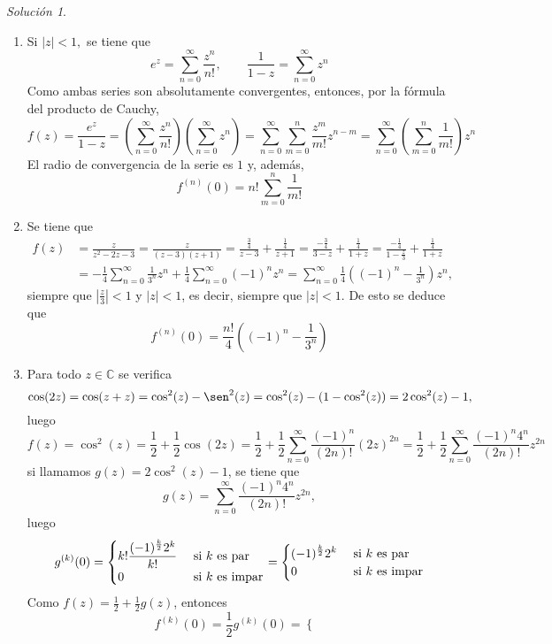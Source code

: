 \documentclass[11pt]{report}
\newcommand{\C}{\mathbb C}
\newcommand{\serie}[2][0]{\sum_{n=#1}^\infty #2}
\theoremstyle{remark}
\newtheorem*{resolution}{Solución}
\begin{document}
\begin{resolution}
\hfill
\begin{enumerate}
    \item Si $|z|<1,$ se tiene que
    \[e^z = \serie{\frac{z^n}{n!}}, \qquad \frac{1}{1-z} = \serie{z^n}\]
    Como ambas series son absolutamente convergentes, entonces, por la fórmula del producto de Cauchy,
    \[f(z)=\frac{e^z}{1-z} = \left(\serie{\frac{z^n}{n!}}\right)\left(\serie{z^n}\right) = \sum_{n=0}^\infty\sum_{m=0}^n\frac{z^m}{m!}z^{n-m} = \sum_{n=0}^\infty \left(\sum_{m=0}^n\frac{1}
    {m!}\right)z^n\]
    El radio de convergencia de la serie es $1$ y, además,
    \[f^{(n)}(0) = n!\sum_{m=0}^n \frac{1}{m!}\]
    \item Se tiene que
    \[
    \begin{aligned}
    f(z)&=\frac{z}{z^2-2z-3} = \frac{z}{(z-3)(z+1)} = \frac{\frac{3}{4}}{z-3}+\frac{\frac{1}{4}}{z+1} =  \frac{-\frac{3}{4}}{3-z}+\frac{\frac{1}{4}}{1+z} = \frac{-\frac{1}{4}}{1-\frac{z}{3}}+\frac{\frac{1}{4}}{1+z} \\
    &= -\frac{1}{4}\serie{\frac{1}{3^n}z^n}+\frac{1}{4}\serie{(-1)^nz^n} = \serie{\frac{1}{4}\left((-1)^n-\frac{1}{3^n}\right)z^n},
    \end{aligned}
    \]
    siempre que $|\frac{z}{3}|<1$ y $|z|<1$, es decir, siempre que $|z|<1$. De esto se deduce que
    \[f^{(n)}(0)=\frac{n!}{4}\left((-1)^n-\frac{1}{3^n}\right)\]
    \item Para todo $z \in \C$ se verifica
    \[\cos(2z)= \cos(z+z)=\cos^2(z)-\sen^2(z) = \cos^2(z)-(1-\cos^2(z)) = 2\cos^2(z)-1,\]
    luego
    \[f(z)=\cos^2(z)=\frac{1}{2}+\frac{1}{2}\cos(2z) = \frac{1}{2}+\frac{1}{2}\serie{\frac{(-1)^n}{(2n)!}(2z)^{2n}} =  \frac{1}{2}+\frac{1}{2}\serie{\frac{(-1)^n4^n}{(2n)!}z^{2n}}\]
    si llamamos $g(z) = 2\cos^2(z)-1$, se tiene que
    \[g(z) = \serie{\frac{(-1)^n4^n}{(2n)!}z^{2n}},\]
    luego
    \[g^{(k)}(0) =\begin{cases}
        \displaystyle k!\frac{(-1)^{\frac{k}{2}}2^k}{k!} & $ si $ k $ es par$ \\
        0 & $ si $ k $ es impar$
    \end{cases} = \begin{cases}
        \displaystyle (-1)^{\frac{k}{2}}2^k & $ si $ k $ es par$ \\
        0 & $ si $ k $ es impar$
    \end{cases} \]
    Como $f(z)=\frac{1}{2}+\frac{1}{2}g(z)$, entonces
    \[f^{(k)}(0) = \frac{1}{2}g^{(k)}(0)= \begin{cases}

\end{cases}\]
\end{enumerate}
\end{resolution}
\end{document}

